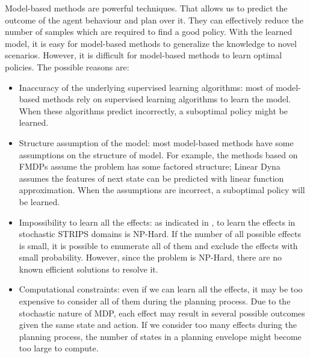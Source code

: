 Model-based methods are powerful techniques. 
That allows us to predict the outcome 
of the agent behaviour and plan over it. They can effectively reduce the number of 
samples which are required to find a good policy.
With the learned model, it is easy for model-based methods to generalize
the knowledge to novel scenarios.
However, it is difficult for model-based methods to learn optimal policies.
The possible reasons are:
\begin{itemize}
\item Inaccuracy of the underlying supervised learning algorithms: most of model-based methods rely on supervised learning algorithms
    to learn the model. When these algorithms predict incorrectly, a suboptimal policy might be learned.
\item Structure assumption of the model: most model-based methods have some assumptions on the structure of model.
    For example, the methods based on FMDPs assume the problem has some factored structure; Linear Dyna \cite{ApproxDyna} assumes
    the features of next state can be predicted with linear function approximation. When the assumptions are incorrect, a suboptimal policy will be learned.
\item Impossibility to learn all the effects: as indicated in \cite{Walsh09}, to learn the effects in stochastic STRIPS domains is NP-Hard.
    If the number of all possible effects is small, it is possible to enumerate all of them and exclude the effects with
    small probability. However, since the problem is NP-Hard, there are no known efficient solutions to resolve it.
\item Computational constraints: even if we can learn all the effects, it may be too expensive to consider all of them during
    the planning process. Due to the stochastic nature of MDP, each effect may result in several possible outcomes given
    the same state and action. If we consider too many effects during the planning process, the number of states in a planning envelope
    might become too large to compute.
\end{itemize}




